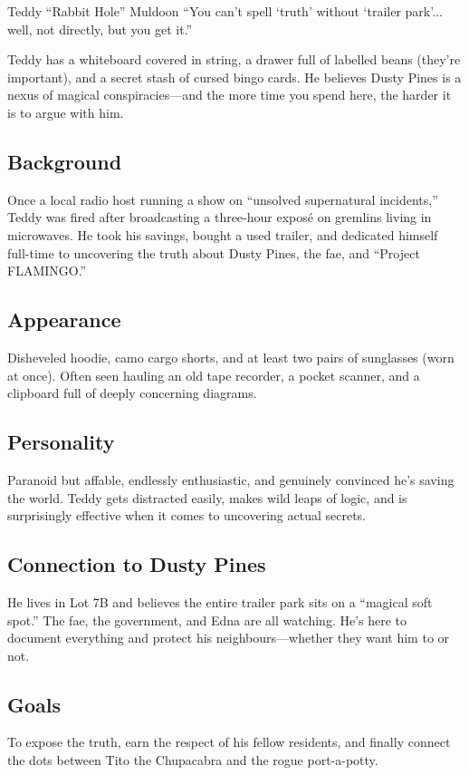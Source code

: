 \newpage
\begin{WyrdCharacterSheet}
    {Teddy “Rabbit Hole” Muldoon}
    {“You can’t spell ‘truth’ without ‘trailer park’... well, not directly, but you get it.”}
    \label{pc:teddy-muldoon}

    Teddy has a whiteboard covered in string, a drawer full of labelled beans (they’re important), and a secret stash of cursed bingo cards. He believes Dusty Pines is a nexus of magical conspiracies—and the more time you spend here, the harder it is to argue with him.

    \subsection{Background}
    Once a local radio host running a show on “unsolved supernatural incidents,” Teddy was fired after broadcasting a three-hour exposé on gremlins living in microwaves. He took his savings, bought a used trailer, and dedicated himself full-time to uncovering the truth about Dusty Pines, the fae, and “Project FLAMINGO.”

    \subsection{Appearance}
    Disheveled hoodie, camo cargo shorts, and at least two pairs of sunglasses (worn at once). Often seen hauling an old tape recorder, a pocket scanner, and a clipboard full of deeply concerning diagrams.

    \subsection{Personality}
    Paranoid but affable, endlessly enthusiastic, and genuinely convinced he’s saving the world. Teddy gets distracted easily, makes wild leaps of logic, and is surprisingly effective when it comes to uncovering actual secrets.

    \subsection{Connection to Dusty Pines}
    He lives in Lot 7B and believes the entire trailer park sits on a “magical soft spot.” The fae, the government, and Edna are all watching. He’s here to document everything and protect his neighbours—whether they want him to or not.

    \subsection{Goals}
    To expose the truth, earn the respect of his fellow residents, and finally connect the dots between Tito the Chupacabra and the rogue port-a-potty.


\end{WyrdCharacterSheet}
